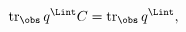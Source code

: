 \begin{equation}
%
\mbox{tr}_{\obs} \, q^{\Lint} C
        = \mbox{tr}_{\obs} \, q^{\Lint},
\label{eq:noghost3}
%
\end{equation}

